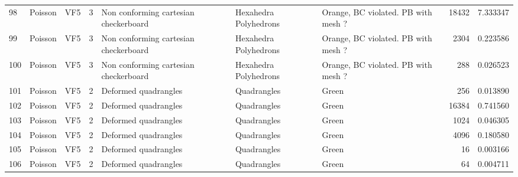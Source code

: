 \begin{tabular}{lllrlllrr}
98  &           Poisson &                            VF5 &               3 &     Non conforming cartesian checkerboard &  Hexahedra Polyhedrons  &  Orange, BC violated. PB with mesh ? &                    18432 &                         7.333347 \\
99  &           Poisson &                            VF5 &               3 &     Non conforming cartesian checkerboard &  Hexahedra Polyhedrons  &  Orange, BC violated. PB with mesh ? &                     2304 &                         0.223586 \\
100 &           Poisson &                            VF5 &               3 &     Non conforming cartesian checkerboard &  Hexahedra Polyhedrons  &  Orange, BC violated. PB with mesh ? &                      288 &                         0.026523 \\
101 &           Poisson &                            VF5 &               2 &                      Deformed quadrangles &            Quadrangles  &                                Green &                      256 &                         0.013890 \\
102 &           Poisson &                            VF5 &               2 &                      Deformed quadrangles &            Quadrangles  &                                Green &                    16384 &                         0.741560 \\
103 &           Poisson &                            VF5 &               2 &                      Deformed quadrangles &            Quadrangles  &                                Green &                     1024 &                         0.046305 \\
104 &           Poisson &                            VF5 &               2 &                      Deformed quadrangles &            Quadrangles  &                                Green &                     4096 &                         0.180580 \\
105 &           Poisson &                            VF5 &               2 &                      Deformed quadrangles &            Quadrangles  &                                Green &                       16 &                         0.003166 \\
106 &           Poisson &                            VF5 &               2 &                      Deformed quadrangles &            Quadrangles  &                                Green &                       64 &                         0.004711 \\

\end{tabular}

